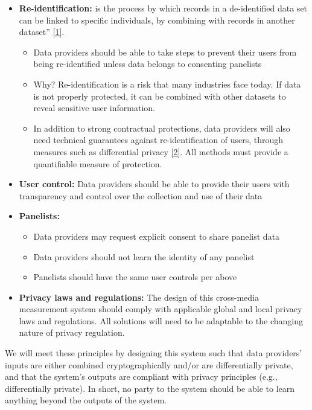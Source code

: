 \documentclass[]{article}
\providecommand{\tightlist}{%
  \setlength{\itemsep}{0pt}\setlength{\parskip}{0pt}}
\begin{document}
\begin{itemize}
\tightlist
\item
  \textbf{Re-identification:} is the process by which records in a de-identified data set can be linked to specific individuals, by combining with records in another dataset'' \hyperref[ref:1]{[1]}.

  \begin{itemize}
  \tightlist
  \item
    Data providers should be able to take steps to prevent their users from being re-identified unless data belongs to consenting panelists
  \item
    Why? Re-identification is a risk that many industries face today. If data is not properly protected, it can be combined with other datasets to reveal sensitive user information.
  \item
    In addition to strong contractual protections, data providers will also need technical guarantees against re-identification of users, through measures such as differential privacy \hyperref[ref:2]{[2]}. All methods must provide a quantifiable measure of protection.
  \end{itemize}
\item
  \textbf{User control:} Data providers should be able to provide their users with transparency and control over the collection and use of their data
\item
  \textbf{Panelists:}

  \begin{itemize}
  \tightlist
  \item
    Data providers may request explicit consent to share panelist data
  \item
    Data providers should not learn the identity of any panelist
  \item
    Panelists should have the same user controls per above
  \end{itemize}
\item
  \textbf{Privacy laws and regulations:} The design of this cross-media measurement system should comply with applicable global and local privacy laws and regulations. All solutions will need to be adaptable to the changing nature of privacy regulation.
\end{itemize}

We will meet these principles by designing this system such that data providers' inputs are either combined cryptographically and/or are differentially private, and that the system's outputs are compliant with privacy principles (e.g., differentially private). In short, no party to the system should be able to learn anything beyond the outputs of the system.
\end{document}
